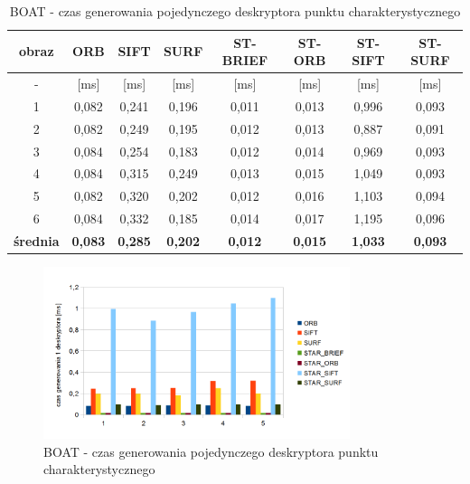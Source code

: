 \begin{table}[htbp]
  \centering
  \caption{BOAT - czas generowania pojedynczego deskryptora punktu charakterystycznego}
    \begin{tabular}{|c|c|c|c|c|c|c|c|}\hline

    obraz & \textbf{ORB} & \textbf{SIFT} & \textbf{SURF} & \textbf{ST-BRIEF} & \textbf{ST-ORB} & \textbf{ST-SIFT} & \textbf{ST-SURF} \\\hline

    - & [ms] & [ms] & [ms] & [ms] & [ms] & [ms] & [ms] \\\hline
    1 & 0,082 & 0,241 & 0,196 & 0,011 & 0,013 & 0,996 & 0,093 \\
    2 & 0,082 & 0,249 & 0,195 & 0,012 & 0,013 & 0,887 & 0,091 \\
    3 & 0,084 & 0,254 & 0,183 & 0,012 & 0,014 & 0,969 & 0,093 \\
    4 & 0,084 & 0,315 & 0,249 & 0,013 & 0,015 & 1,049 & 0,093 \\
    5 & 0,082 & 0,320 & 0,202 & 0,012 & 0,016 & 1,103 & 0,094 \\
    6 & 0,084 & 0,332 & 0,185 & 0,014 & 0,017 & 1,195 & 0,096 \\\hline
    \textbf{średnia} & \textbf{0,083} & \textbf{0,285} & \textbf{0,202} & \textbf{0,012} & \textbf{0,015} & \textbf{1,033} & \textbf{0,093} \\\hline
    
    \end{tabular}%
  \label{tab:boat_f3}%
\end{table}%


\begin{figure}
\centering
\includegraphics[width=0.8\textwidth]{pict/mikolajczyk/boat/f3.png}
\caption{BOAT - czas generowania pojedynczego deskryptora punktu charakterystycznego}
\label{fig:boat_f3}
\end{figure}


